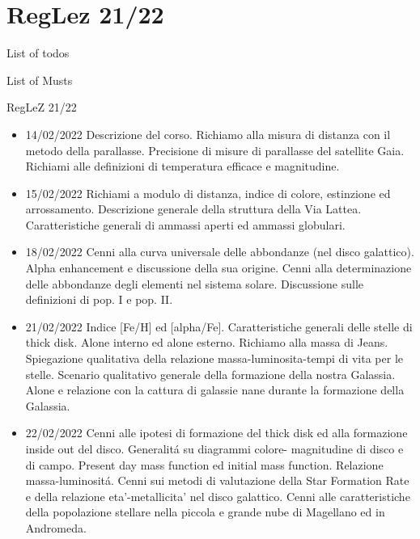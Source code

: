 \section{RegLez 21/22}

\begin{frame}[allowframebreaks]{List of todos}
\end{frame}


\begin{frame}[allowframebreaks]{List of Musts}
\end{frame}

\begin{frame}[allowframebreaks]{RegLeZ 21/22}
\begin{itemize}
\item 14/02/2022 Descrizione del corso. Richiamo alla misura di distanza con il metodo della parallasse. Precisione di misure di parallasse del satellite Gaia. Richiami alle definizioni di temperatura efficace e magnitudine.
\item 15/02/2022 Richiami a modulo di distanza, indice di colore, estinzione ed arrossamento. Descrizione generale della struttura della Via Lattea. Caratteristiche generali di ammassi aperti ed ammassi globulari.
\item 18/02/2022 Cenni alla curva universale delle abbondanze (nel disco galattico). Alpha enhancement e discussione della sua origine. Cenni alla determinazione delle abbondanze degli elementi nel sistema solare. Discussione sulle definizioni di pop. I e pop. II.
\item 21/02/2022 Indice [Fe/H] ed [alpha/Fe]. Caratteristiche generali delle stelle di thick disk. Alone interno ed alone esterno. Richiamo alla massa di Jeans. Spiegazione qualitativa della relazione massa-luminosita-tempi di vita per le stelle. Scenario qualitativo generale della formazione della nostra Galassia. Alone e relazione con la cattura di galassie nane durante la formazione della Galassia.
\item 22/02/2022 Cenni alle ipotesi di formazione del thick disk ed alla formazione inside out del disco. Generalit\'a su diagrammi colore- magnitudine di disco e di campo. Present day mass function ed initial mass function. Relazione massa-luminosit\'a. Cenni sui metodi di valutazione della Star Formation Rate e della relazione eta'-metallicita' nel disco galattico. Cenni alle caratteristiche della popolazione stellare nella piccola e grande nube di Magellano ed in Andromeda.

\end{itemize}
\end{frame}
